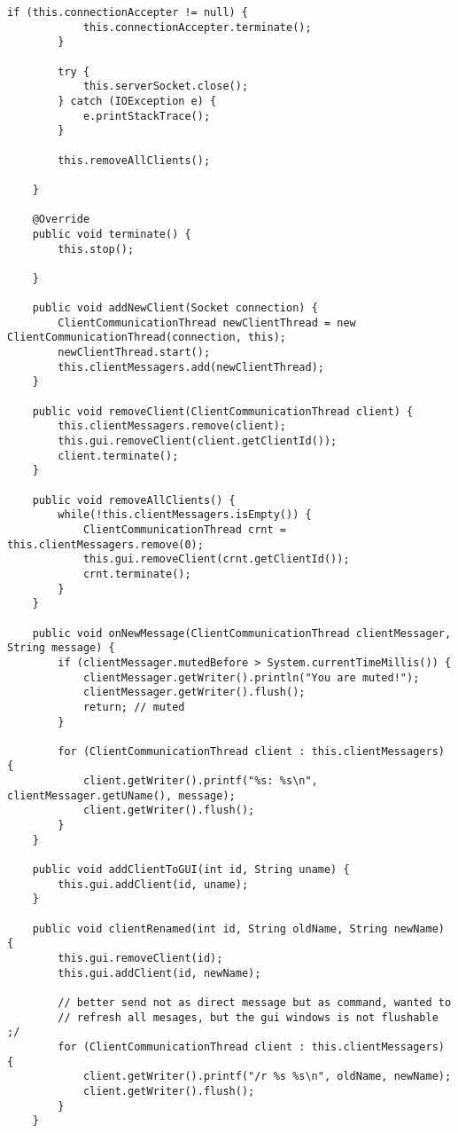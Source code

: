 \begin{enumerate}
\begin{lstlisting}[style=java]
        if (this.connectionAccepter != null) {
            this.connectionAccepter.terminate();
        }

        try {
            this.serverSocket.close();
        } catch (IOException e) {
            e.printStackTrace();
        }

        this.removeAllClients();

    }

    @Override
    public void terminate() {
        this.stop();

    }

    public void addNewClient(Socket connection) {
        ClientCommunicationThread newClientThread = new ClientCommunicationThread(connection, this);
        newClientThread.start();
        this.clientMessagers.add(newClientThread);
    }

    public void removeClient(ClientCommunicationThread client) {
        this.clientMessagers.remove(client);
        this.gui.removeClient(client.getClientId());
        client.terminate();
    }

    public void removeAllClients() {
        while(!this.clientMessagers.isEmpty()) {
            ClientCommunicationThread crnt = this.clientMessagers.remove(0);
            this.gui.removeClient(crnt.getClientId());
            crnt.terminate();
        }
    }

    public void onNewMessage(ClientCommunicationThread clientMessager, String message) {
        if (clientMessager.mutedBefore > System.currentTimeMillis()) {
            clientMessager.getWriter().println("You are muted!");
            clientMessager.getWriter().flush();
            return; // muted
        }

        for (ClientCommunicationThread client : this.clientMessagers) {
            client.getWriter().printf("%s: %s\n", clientMessager.getUName(), message);
            client.getWriter().flush();
        }
    }

    public void addClientToGUI(int id, String uname) {
        this.gui.addClient(id, uname);
    }

    public void clientRenamed(int id, String oldName, String newName) {
        this.gui.removeClient(id);
        this.gui.addClient(id, newName);

        // better send not as direct message but as command, wanted to
        // refresh all mesages, but the gui windows is not flushable ;/
        for (ClientCommunicationThread client : this.clientMessagers) {
            client.getWriter().printf("/r %s %s\n", oldName, newName);
            client.getWriter().flush();
        }
    }


\end{lstlisting}
\end{enumerate}
